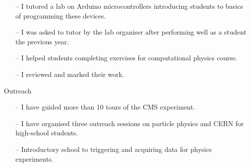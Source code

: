 \documentclass[10pt,a4paper]{altacv}
\begin{document}



\begin{itemize}
    \setlength{\itemindent}{0.5em}
    \item[--]   I tutored a lab on Arduino microcontrollers introducing students to basics of programming these devices.
    \item[--]   I was asked to tutor by the lab organiser after performing well as a student the previous year.
\end{itemize}

\medskip


\begin{itemize}
    \setlength{\itemindent}{0.5em}
    \item[--]   I helped students completing exercises for computational physics course.
    \item[--]   I reviewed and marked their work.
\end{itemize}

\medskip

{\large\color{emphasis}Outreach\par}
\smallskip

\begin{itemize}
    \setlength{\itemindent}{0.5em}
    \item[--]   I have guided more than 10 tours of the CMS experiment.
    \item[--]   I have organised three outreach sessions on particle physics and CERN for high-school students.
\end{itemize}



\begin{itemize}
    \setlength{\itemindent}{0.5em}
    \item[--]   Introductory school to triggering and acquiring data for physics experiments.
\end{itemize}

\medskip
\end{document}
